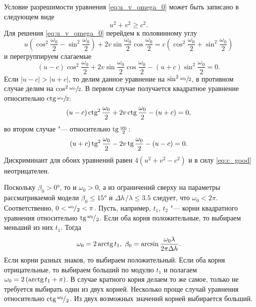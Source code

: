 \documentclass[../main.tex]{subfiles}
\begin{document}
Условие разрешимости уравнения \eqref{eq:u_v_omega_0} может быть записано в следующем виде
\begin{equation} \label{eq:c_good}
  u^2 + v^2 \geq c^2.
\end{equation}
Для решения \eqref{eq:u_v_omega_0} перейдем к половинному углу
\begin{equation*}
  u \left( \cos^2\frac{\omega_0}{2} - \sin^2\frac{\omega_0}{2} \right) + 2v \sin\frac{\omega_0}{2} \cos\frac{\omega_0}{2} =
  c \left(\cos^2\frac{\omega_0}{2} + \sin^2\frac{\omega_0}{2} \right)
\end{equation*}
и перегруппируем слагаемые
\begin{equation*}
  \left(u - c\right) \cos^2\frac{\omega_0}{2} + 2v \sin\frac{\omega_0}{2} \cos\frac{\omega_0}{2} - \left(u + c\right) \sin^2\frac{\omega_0}{2} = 0.
\end{equation*}
Если $\left|u - c\right| > \left|u + c\right|$, то делим данное уравнение на $\sin^2 \sfrac{\omega_0}{2}$, в противном случае делим на $\cos^2 \sfrac{\omega_0}{2}$. В первом случае получается квадратное уравнение относительно $\operatorname{\text{ctg}} \sfrac{\omega_0}{2}$:
\begin{equation*}
    \left(u - c\right) \operatorname{\text{ctg}}^2 \frac{\omega_0}{2} + 2v \operatorname{\text{ctg}}\frac{\omega_0}{2} - \left(u + c\right) = 0,
\end{equation*}
во втором случае "--- относительно $\operatorname{\text{tg}} \frac{\omega_0}{2}$:
\begin{equation*}
    \left(u + c\right) \operatorname{\text{tg}}^2 \frac{\omega_0}{2} - 2v \operatorname{\text{tg}} \frac{\omega_0}{2} - \left(u - c\right) = 0.
\end{equation*}
Дискриминант для обоих уравнений равен $4\left(u^2 + v^2 - c^2\right)$ и в силу \eqref{eq:c_good} неотрицателен.

Поскольку $\beta_0 > \ang{0}$, то и $\omega_0 > 0$, а из ограничений сверху на параметры рассматриваемой модели $\beta_0 \leq \ang{15}$ и $ \Delta h^{}/\lambda \leq 3.5$ следует, что $\omega_0 < 2 \pi $. Соответственно, $0 < {}^{\omega_0}\!/_{2} < \pi$. Пусть, например, $t_1$, $t_2$ "--- корни квадратного уравнения относительно $\operatorname{\text{tg}} {}^{\omega_0}\!/_{2}$. Если оба корня положительные, то выбираем меньший из них $t_1$. Тогда
\begin{equation*}
  \omega_0 = 2 \operatorname{\text{arctg}} t_1, \; \beta_0 = \arcsin \frac{\omega_0 \lambda} {2\pi \Delta h}.
\end{equation*}
Если корни разных знаков, то выбираем положительный. Если оба корня отрицательные, то выбираем больший по модулю $t_1$ и полагаем $\omega_0 = 2\left( \operatorname{\text{arctg}} t_1 + \pi\right)$. В случае кратного корня делаем то же самое, только не требуется выбирать один из двух корней.
Несколько проще случай уравнения относительно $\operatorname{\text{ctg}}{}^{\omega_0}\!/_{2}$. Из двух возможных значений корней выбирается больший.
\end{document}
